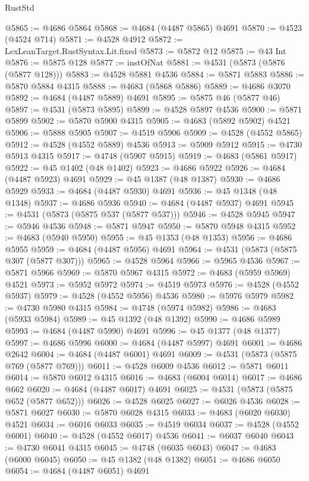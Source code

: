 \begin{lexlean}{RustStd}
\begin{coremodule}
@5865 := @4686 @5864
@5868 := @4684 (@4487 @5865) @4691
@5870 := @4523 (@4524 @714)
@5871 := @4528 @4912
@5872 := LexLeanTarget.RustSyntax.Lit.fixed
@5873 := @5872 @12
@5875 := @43 Int
@5876 := @5875 @128
@5877 := instOfNat
@5881 := @4531 (@5873 (@5876 (@5877 @128)))
@5883 := @4528 @5881 @4536
@5884 := @5871 @5883
@5886 := @5870 @5884 @4315
@5888 := @4683 (@5868 @5886)
@5889 := @4686 @3070
@5892 := @4684 (@4487 @5889) @4691
@5895 := @5875 @46 (@5877 @46)
@5897 := @4531 (@5873 @5895)
@5899 := @4528 @5897 @4536
@5900 := @5871 @5899
@5902 := @5870 @5900 @4315
@5905 := @4683 (@5892 @5902) @4521
@5906 := @5888 @5905
@5907 := @4519 @5906
@5909 := @4528 (@4552 @5865)
@5912 := @4528 (@4552 @5889) @4536
@5913 := @5909 @5912
@5915 := @4730 @5913 @4315
@5917 := @4748 (@5907 @5915)
@5919 := @4683 (@5861 @5917)
@5922 := @45 @1402 (@48 @1402)
@5923 := @4686 @5922
@5926 := @4684 (@4487 @5923) @4691
@5929 := @45 @1387 (@48 @1387)
@5930 := @4686 @5929
@5933 := @4684 (@4487 @5930) @4691
@5936 := @45 @1348 (@48 @1348)
@5937 := @4686 @5936
@5940 := @4684 (@4487 @5937) @4691
@5945 := @4531 (@5873 (@5875 @537 (@5877 @537)))
@5946 := @4528 @5945
@5947 := @5946 @4536
@5948 := @5871 @5947
@5950 := @5870 @5948 @4315
@5952 := @4683 (@5940 @5950)
@5955 := @45 @1353 (@48 @1353)
@5956 := @4686 @5955
@5959 := @4684 (@4487 @5956) @4691
@5964 := @4531 (@5873 (@5875 @307 (@5877 @307)))
@5965 := @4528 @5964
@5966 := @5965 @4536
@5967 := @5871 @5966
@5969 := @5870 @5967 @4315
@5972 := @4683 (@5959 @5969) @4521
@5973 := @5952 @5972
@5974 := @4519 @5973
@5976 := @4528 (@4552 @5937)
@5979 := @4528 (@4552 @5956) @4536
@5980 := @5976 @5979
@5982 := @4730 @5980 @4315
@5984 := @4748 (@5974 @5982)
@5986 := @4683 (@5933 @5984)
@5989 := @45 @1392 (@48 @1392)
@5990 := @4686 @5989
@5993 := @4684 (@4487 @5990) @4691
@5996 := @45 @1377 (@48 @1377)
@5997 := @4686 @5996
@6000 := @4684 (@4487 @5997) @4691
@6001 := @4686 @2642
@6004 := @4684 (@4487 @6001) @4691
@6009 := @4531 (@5873 (@5875 @769 (@5877 @769)))
@6011 := @4528 @6009 @4536
@6012 := @5871 @6011
@6014 := @5870 @6012 @4315
@6016 := @4683 (@6004 @6014)
@6017 := @4686 @662
@6020 := @4684 (@4487 @6017) @4691
@6025 := @4531 (@5873 (@5875 @652 (@5877 @652)))
@6026 := @4528 @6025
@6027 := @6026 @4536
@6028 := @5871 @6027
@6030 := @5870 @6028 @4315
@6033 := @4683 (@6020 @6030) @4521
@6034 := @6016 @6033
@6035 := @4519 @6034
@6037 := @4528 (@4552 @6001)
@6040 := @4528 (@4552 @6017) @4536
@6041 := @6037 @6040
@6043 := @4730 @6041 @4315
@6045 := @4748 (@6035 @6043)
@6047 := @4683 (@6000 @6045)
@6050 := @45 @1382 (@48 @1382)
@6051 := @4686 @6050
@6054 := @4684 (@4487 @6051) @4691

\end{coremodule}
\end{lexlean}
